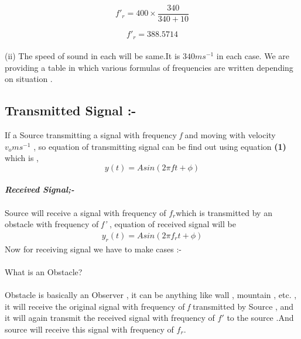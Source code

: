 \documentclass[journal,12pt,twocolumn]{IEEEtran}
\theoremstyle{remark}
\begin{document}
$$f'_r=400\times\frac{340}{340+10}$$

$$f'_r=388.5714$$\\
(ii) The speed of sound in each will be same.It is $340  ms^{-1}$ in each case.
We are providing a table in which various formulas of frequencies are written depending on situation .
\subsection*{\textbf{Transmitted Signal :-}}
If a Source transmitting a signal with frequency \textit{f} and moving with velocity  $v_o ms^{-1} $
, so equation of transmitting signal can be find out using equation \textbf{(1)} which is ,$$y(t) = Asin( 2 \pi ft + \phi )$$\\
\textit{\textbf{Received Signal;-}\\}\\
Source will receive a signal with frequency of $f_r$which is transmitted by an obstacle with frequency of \textit{f'} , equation of received signal will be
\begin{align}y_r(t) = Asin( 2 \pi f_rt + \phi )\end{align}
Now for receiving signal we have to make cases :-\\
\\
What is an Obstacle?\\\\
Obstacle is basically an Observer , it can be anything like wall , mountain , etc. , it will receive the original signal with frequency of  \textit{f} transmitted by Source , and it will again transmit  the received signal with frequency of $f'$ to the source .And source will receive this signal with frequency of $f_r$.\\\\
\end{document}
